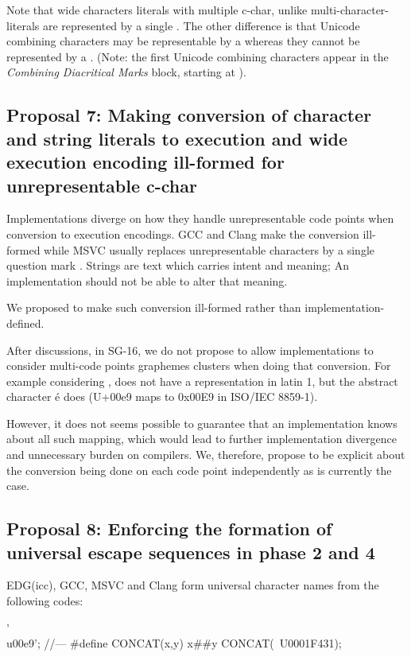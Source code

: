 \documentclass{wg21}
\begin{document}
Note that wide characters literals with multiple c-char, unlike multi-character-literals are represented by a single .
The other difference is that Unicode combining characters may be representable by a  whereas they cannot be represented by a . 
(Note: the first Unicode combining characters appear in the \emph{Combining Diacritical Marks} block, starting at ).


\subsection{Proposal 7: Making conversion of character and string literals to execution and wide execution encoding ill-formed for unrepresentable c-char}

Implementations diverge on how they handle unrepresentable code points when conversion to execution encodings.
GCC and Clang make the conversion ill-formed while MSVC usually replaces unrepresentable characters by a single question mark .
Strings are text which carries intent and meaning; An implementation should not be able to alter that meaning.

We proposed to make such conversion ill-formed rather than implementation-defined.

After discussions, in SG-16, we do not propose to allow implementations to consider multi-code points graphemes clusters
when doing that conversion. For example considering ,  does not have a representation in latin 1,
but the abstract character é does (U+00e9 maps to 0x00E9 in ISO/IEC 8859-1).

However, it does not seems possible to guarantee that an implementation knows about all such mapping, which would lead to further implementation
divergence and unnecessary burden on compilers.
We, therefore, propose to be explicit about the conversion being done on each code point independently as is currently the case.

\subsection{Proposal 8: Enforcing the formation of universal escape sequences in phase 2 and 4}

EDG(icc), GCC, MSVC and Clang form universal character names from the following codes:
\begin{colorblock}
'\\
u00e9';
//---
#define CONCAT(x,y) x\#\#y
CONCAT(\, U0001F431);
\end{colorblock}
\end{document}
